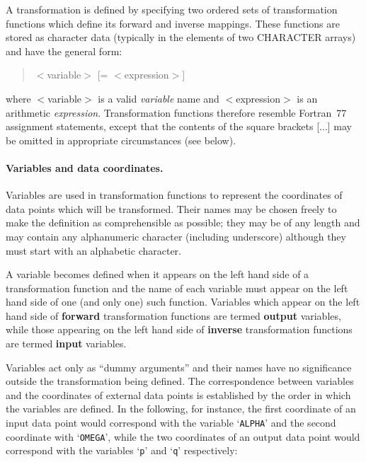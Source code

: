 \documentclass[twoside,11pt]{article}
\renewcommand{\_}{\texttt{\symbol{95}}}
\newcommand{\name}[1]{\mbox{\small{#1}}}
\begin{document}
A transformation is defined by specifying two ordered sets of transformation
functions which define its forward and inverse mappings.
These functions are stored as character data (typically in the elements of
two \name{CHARACTER} arrays) and have the general form:

\begin{quote}
$<$variable$>$ [= $<$expression$>$]
\end{quote}

where \mbox{$<$variable$>$} is a valid \emph{variable} name and
\mbox{$<$expression$>$} is an arithmetic \emph{expression}.
Transformation functions therefore resemble Fortran~77 assignment
statements, except that the contents of the square brackets \mbox{[...]} may
be omitted in appropriate circumstances (see below).

\paragraph{Variables and data coordinates.}
Variables are used in transformation functions to represent the coordinates
of data points which will be transformed.
Their names may be chosen freely to make the definition as comprehensible as
possible; they may be of any length and may contain any alphanumeric
character (including underscore) although they must start with an alphabetic
character.

A variable becomes defined when it appears on the left hand side of a
transformation function and the name of each variable must appear on the
left hand side of one (and only one) such function.
Variables which appear on the left hand side of \textbf{forward} transformation
functions are termed \textbf{output} variables, while those appearing on the
left hand side of \textbf{inverse} transformation functions are termed
\textbf{input} variables.

Variables act only as ``dummy arguments'' and their names have no
significance outside the transformation being defined.
The correspondence between variables and the coordinates of external data
points is established by the order in which the variables are defined.
In the following, for instance, the first coordinate of an input data point
would correspond with the variable `\verb#ALPHA#' and the second coordinate
with `\verb#OMEGA#', while the two coordinates of an output data point would
correspond with the variables `\verb#p#' and `\verb#q#' respectively:
\end{document}
